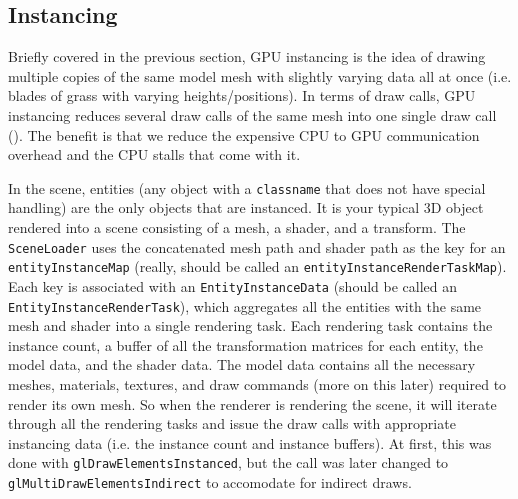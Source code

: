\documentclass[letterpaper, 10 pt, conference]{ieeeconf}  %
\begin{document}
\subsection{Instancing}
Briefly covered in the previous section, GPU instancing is the idea of drawing multiple copies of the same model mesh with slightly varying data all at once (i.e. blades of grass with varying heights/positions). In terms of draw calls, GPU instancing reduces several draw calls of the same mesh into one single draw call (\cite{Vries_2014}).  The benefit is that we reduce the expensive CPU to GPU communication overhead and the CPU stalls that come with it.

In the scene, entities (any object with a \texttt{classname} that does not have special handling) are the only objects that are instanced. It is your typical 3D object rendered into a scene consisting of a mesh, a shader, and a transform. The \texttt{SceneLoader} uses the concatenated mesh path and shader path as the key for an \texttt{entityInstanceMap} (really, should be called an \texttt{entityInstanceRenderTaskMap}). Each key is associated with an \texttt{EntityInstanceData} (should be called an \texttt{EntityInstanceRenderTask}), which aggregates all the entities with the same mesh and shader into a single rendering task. Each rendering task contains the instance count, a buffer of all the transformation matrices for each entity, the model data, and the shader data. The model data contains all the necessary meshes, materials, textures, and draw commands (more on this later) required to render its own mesh. So when the renderer is rendering the scene, it will iterate through all the rendering tasks and issue the draw calls with appropriate instancing data (i.e. the instance count and instance buffers). At first, this was done with \texttt{glDrawElementsInstanced}, but the call was later changed to \texttt{glMultiDrawElementsIndirect} to accomodate for indirect draws.
\end{document}
